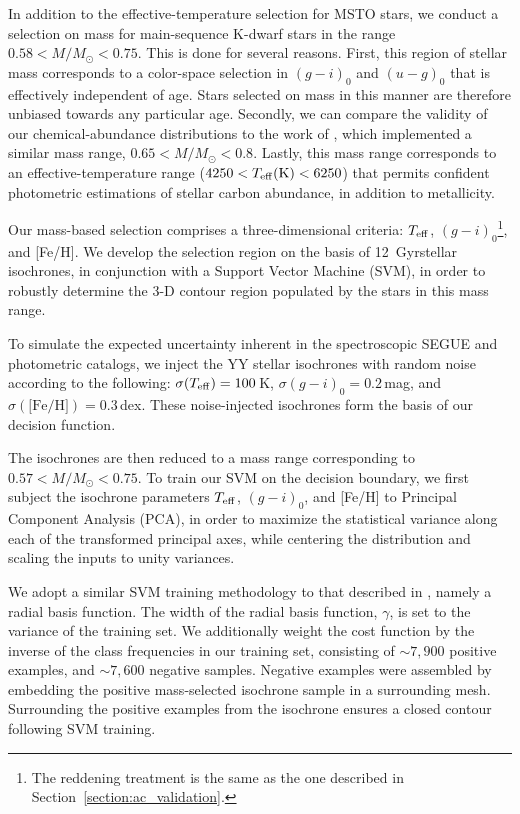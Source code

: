\documentclass[twocolumn,trackchanges]{aastex63}
\begin{document}
In addition to the effective-temperature selection for MSTO stars, we conduct a selection on mass for main-sequence K-dwarf stars in the range $0.58 < M/M_{\odot} < 0.75$. This is done for several reasons. 
First, this region of stellar mass corresponds to a color-space selection in $(g-i)_0$ and $(u - g)_0$ that is effectively independent of age. Stars selected on mass in this manner are therefore unbiased towards any particular age.
Secondly, we can compare the validity of our chemical-abundance distributions to the work of \citet{An:2015}, which implemented a similar mass range, $0.65 < M/M_{\odot} < 0.8$.  Lastly, this mass range corresponds to an 
effective-temperature range ($4250 < T_{\rm eff}\textrm{(K)} < 6250$) that permits confident photometric estimations of stellar carbon abundance, in addition to metallicity.

Our mass-based selection comprises a three-dimensional criteria: $T_{\rm eff}$, $(g-i)_0$\footnote{The reddening treatment is the same as the one described in Section~\ref{section:ac_validation}.}, and [Fe/H]. We develop the selection region on the basis of 12\, Gyrstellar isochrones, in conjunction with a Support Vector Machine (SVM), in order to robustly determine the 3-D contour region populated by the stars in this mass range. 

To simulate the expected uncertainty inherent in the spectroscopic SEGUE and photometric catalogs, we inject the YY stellar isochrones with random noise according to the following: $\sigma(T_{\rm eff}) = 100$\,K, $\sigma(g - i)_0= 0.2$\,mag, and $\sigma(\textrm{[Fe/H]}) = 0.3$\,dex. These noise-injected isochrones form the basis of our decision function. 

The isochrones are then reduced to a mass range corresponding to $0.57 < M/M_{\odot} < 0.75$. To train our SVM on the decision boundary, we first subject the isochrone parameters $T_{\rm eff}$, $(g-i)_0$, and [Fe/H] to Principal Component Analysis (PCA), in order to maximize the statistical variance along each of the transformed principal axes, while centering the distribution and scaling the inputs to unity variances.

We adopt a similar SVM training methodology to that described in \citet{Whitten:2019b}, namely a radial basis function. The width of the radial basis function, $\gamma$, is set to the variance of the training set. We additionally weight the cost function by the inverse of the class frequencies in our training set, consisting of $\sim 7,900$ positive examples, and $\sim 7,600$ negative samples. Negative examples were assembled by embedding the positive mass-selected isochrone sample in a surrounding mesh. Surrounding the positive examples from the isochrone ensures a closed contour following SVM training.
\end{document}

